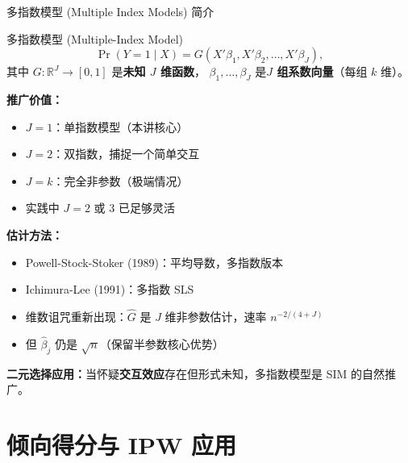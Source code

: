 \documentclass[aspectratio=169, 10pt]{beamer}
\begin{document}
\begin{frame}[shrink=18]{多指数模型 (Multiple Index Models) 简介}

  \begin{definitionbox}{{多指数模型 (Multiple-Index Model)}}
    $$\Pr(Y=1\mid X) = G(X'\beta_1, X'\beta_2, \ldots, X'\beta_J),$$
    其中 $G: \mathbb{R}^J \to [0, 1]$ 是\textbf{未知 $J$ 维函数}，
    $\beta_1, \ldots, \beta_J$ 是\textbf{$J$ 组系数向量}（每组 $k$ 维）。
  \end{definitionbox}

  \begin{highlightbox}
    \textbf{推广价值：}
    \begin{itemize}\setlength{\itemsep}{1pt}
      \item $J = 1$：单指数模型（本讲核心）
      \item $J = 2$：双指数，捕捉一个简单交互
      \item $J = k$：完全非参数（极端情况）
      \item 实践中 $J = 2$ 或 $3$ 已足够灵活
    \end{itemize}
  \end{highlightbox}

  \begin{keybox}
    \textbf{估计方法：}
    \begin{itemize}\setlength{\itemsep}{1pt}
      \item Powell-Stock-Stoker (1989)：平均导数，多指数版本
      \item Ichimura-Lee (1991)：多指数 SLS
      \item 维数诅咒重新出现：$\hat G$ 是 $J$ 维非参数估计，速率 $n^{-2/(4+J)}$
      \item 但 $\hat\beta_j$ 仍是 $\sqrt{n}$（保留半参数核心优势）
    \end{itemize}
  \end{keybox}

  \begin{keybox}
    \textbf{二元选择应用：}当怀疑\textbf{交互效应}存在但形式未知，多指数模型是 SIM 的自然推广。
  \end{keybox}

\end{frame}

\section{倾向得分与 IPW 应用}
\end{document}
